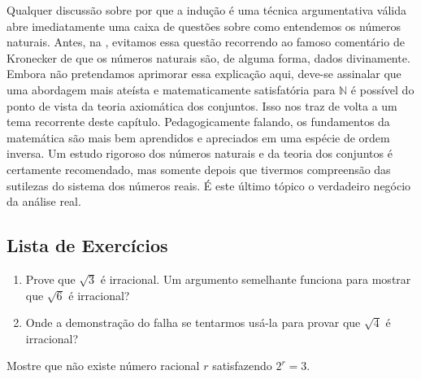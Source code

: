 Qualquer discussão sobre por que a indução é uma técnica argumentativa válida abre imediatamente uma caixa de questões sobre como entendemos os números naturais. Antes, na , evitamos essa questão recorrendo ao famoso comentário de Kronecker de que os números naturais são, de alguma forma, dados divinamente. Embora não pretendamos aprimorar essa explicação aqui, deve-se assinalar que uma abordagem mais ateísta e matematicamente satisfatória para $\mathbb{N}$ é possível do ponto de vista da teoria axiomática dos conjuntos. Isso nos traz de volta a um tema recorrente deste capítulo. Pedagogicamente falando, os fundamentos da matemática são mais bem aprendidos e apreciados em uma espécie de ordem inversa. Um estudo rigoroso dos números naturais e da teoria dos conjuntos é certamente recomendado, mas somente depois que tivermos compreensão das sutilezas do sistema dos números reais. É este último tópico o verdadeiro negócio da análise real.

\subsection{Lista de Exercícios}\label{subsec:exercicios-preliminares}

\begin{exercise}\label{ex:raiz3-irracional}
\begin{enumerate}[label=\alph*)]
\item Prove que $\sqrt{3}$ é irracional. Um argumento semelhante funciona para mostrar que $\sqrt{6}$ é irracional?
\item Onde a demonstração do  falha se tentarmos usá-la para provar que $\sqrt{4}$ é irracional?
\end{enumerate}
\end{exercise}

\begin{exercise}\label{ex:potencia-racional}
Mostre que não existe número racional $r$ satisfazendo $2^{r} = 3$.
\end{exercise}

